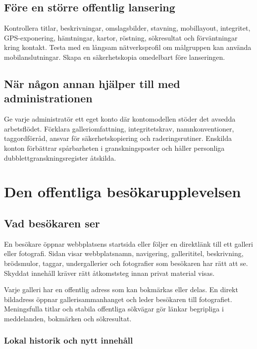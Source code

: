 \documentclass[11pt,a4paper]{article}
\begin{document}
\subsection{Före en större offentlig lansering}

Kontrollera titlar, beskrivningar, omslagsbilder, stavning, mobillayout,
integritet, GPS-exponering, hämtningar, kartor, röstning, sökresultat och
förväntningar kring kontakt. Testa med en långsam nätverksprofil om målgruppen
kan använda mobilanslutningar. Skapa en säkerhetskopia omedelbart före
lanseringen.

\subsection{När någon annan hjälper till med administrationen}

Ge varje administratör ett eget konto där kontomodellen stöder det avsedda
arbetsflödet. Förklara galleriomfattning, integritetskrav, namnkonventioner,
taggordförråd, ansvar för säkerhetskopiering och raderingsrutiner. Enskilda
konton förbättrar spårbarheten i granskningsposter och håller personliga
dubblettgranskningsregister åtskilda.

\section{Den offentliga besökarupplevelsen}
\label{sec:public}

\subsection{Vad besökaren ser}

En besökare öppnar webbplatsens startsida eller följer en direktlänk till ett
galleri eller fotografi. Sidan visar webbplatsnamn, navigering, gallerititel,
beskrivning, brödsmulor, taggar, undergallerier och fotografier som besökaren
har rätt att se. Skyddat innehåll kräver rätt åtkomststeg innan privat material
visas.

Varje galleri har en offentlig adress som kan bokmärkas eller delas. En direkt
bildadress öppnar gallerisammanhanget och leder besökaren till fotografiet.
Meningsfulla titlar och stabila offentliga sökvägar gör länkar begripliga i
meddelanden, bokmärken och sökresultat.

\subsubsection{Lokal historik och nytt innehåll}
\end{document}
